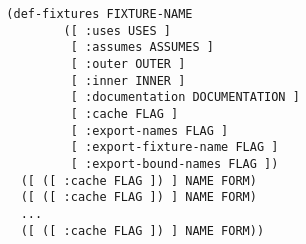 \begin{verbatim}
  (def-fixtures FIXTURE-NAME
          ([ :uses USES ]
           [ :assumes ASSUMES ]
           [ :outer OUTER ]
           [ :inner INNER ]
           [ :documentation DOCUMENTATION ]
           [ :cache FLAG ]
           [ :export-names FLAG ]
           [ :export-fixture-name FLAG ]
           [ :export-bound-names FLAG ])
    ([ ([ :cache FLAG ]) ] NAME FORM)
    ([ ([ :cache FLAG ]) ] NAME FORM)
    ...
    ([ ([ :cache FLAG ]) ] NAME FORM))
\end{verbatim}
